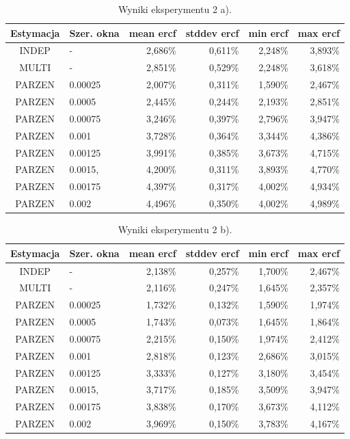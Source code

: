 \documentclass{article}
\begin{document}
	\begin{table}[H] \centering
		\begin{tabular}{c|l|r|r|r|r}
			Estymacja & Szer. okna & mean ercf & stddev ercf & min ercf & max ercf \\ \hline
			INDEP  & -       & 2,686\%	& 0,611\%	& 2,248\%	& 3,893\% \\ 
			MULTI  & -       & 2,851\%	& 0,529\%	& 2,248\%	& 3,618\% \\ 
			PARZEN & 0.00025 & 2,007\%	& 0,311\%	& 1,590\%	& 2,467\% \\ 
			PARZEN & 0.0005  & 2,445\%	& 0,244\%	& 2,193\%	& 2,851\% \\
			PARZEN & 0.00075 & 3,246\%	& 0,397\%	& 2,796\%	& 3,947\% \\
			PARZEN & 0.001   & 3,728\%	& 0,364\%	& 3,344\%	& 4,386\% \\ 
			PARZEN & 0.00125 & 3,991\%	& 0,385\%	& 3,673\%	& 4,715\% \\ 
			PARZEN & 0.0015, & 4,200\%	& 0,311\%	& 3,893\%	& 4,770\% \\ 
			PARZEN & 0.00175 & 4,397\%	& 0,317\%	& 4,002\%	& 4,934\% \\ 
			PARZEN & 0.002   & 4,496\%	& 0,350\%	& 4,002\%	& 4,989\% 
		\end{tabular}
		\caption{Wyniki eksperymentu 2 a). }
		\label{tab:2a}
	\end{table}

	\begin{table}[H] \centering
		\begin{tabular}{c|l|r|r|r|r}
			Estymacja & Szer. okna & mean ercf & stddev ercf & min ercf & max ercf \\ \hline
			INDEP  & -       & 2,138\%	& 0,257\%	& 1,700\%	& 2,467\% \\ 
			MULTI  & -       & 2,116\%	& 0,247\%	& 1,645\%	& 2,357\% \\ 
			PARZEN & 0.00025 & 1,732\%	& 0,132\%	& 1,590\%	& 1,974\% \\ 
			PARZEN & 0.0005  & 1,743\%	& 0,073\%	& 1,645\%	& 1,864\% \\
			PARZEN & 0.00075 & 2,215\%	& 0,150\%	& 1,974\%	& 2,412\% \\
			PARZEN & 0.001   & 2,818\%	& 0,123\%	& 2,686\%	& 3,015\% \\ 
			PARZEN & 0.00125 & 3,333\%	& 0,127\%	& 3,180\%	& 3,454\% \\ 
			PARZEN & 0.0015, & 3,717\%	& 0,185\%	& 3,509\%	& 3,947\% \\ 
			PARZEN & 0.00175 & 3,838\%	& 0,170\%	& 3,673\%	& 4,112\% \\ 
			PARZEN & 0.002   & 3,969\%	& 0,150\%	& 3,783\%	& 4,167\% 
		\end{tabular}
		\caption{Wyniki eksperymentu 2 b). }
		\label{tab:2a}
	\end{table}
\end{document}
